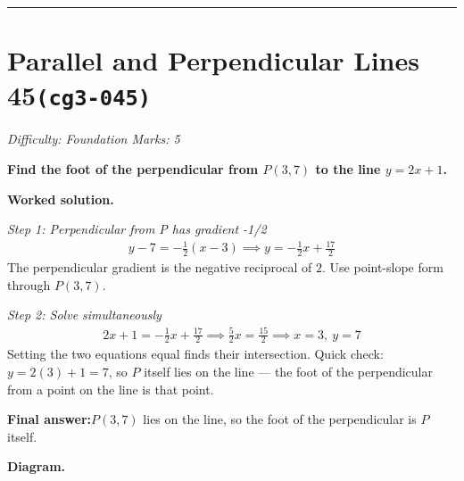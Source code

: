 \documentclass[11pt]{article}
\newcommand{\question}[1]{\par\medskip\noindent\textbf{#1}\par}
\begin{document}
\medskip\hrule

\section*{Parallel and Perpendicular Lines 45\quad\small\texttt{(cg3-045)}}
\textit{Difficulty: Foundation \quad\textbar\quad Marks: 5}

\question{Find the foot of the perpendicular from \( P(3, 7) \) to the line \( y = 2x + 1 \).}

\textbf{Worked solution.}

\textit{Step 1: Perpendicular from P has gradient -1/2}
\[\begin{gathered}
y - 7 = -\frac{1}{2}(x - 3) \implies y = -\frac{1}{2}x + \frac{17}{2}
\end{gathered}\]
The perpendicular gradient is the negative reciprocal of \( 2 \). Use point-slope form through \( P(3, 7) \).

\textit{Step 2: Solve simultaneously}
\[\begin{gathered}
2x + 1 = -\frac{1}{2}x + \frac{17}{2} \implies \frac{5}{2}x = \frac{15}{2} \implies x = 3,\ y = 7
\end{gathered}\]
Setting the two equations equal finds their intersection. Quick check: \( y = 2(3) + 1 = 7 \), so \( P \) itself lies on the line --- the foot of the perpendicular from a point on the line is that point.

\begin{answerbox}
\textbf{Final answer:}\quad \(\displaystyle P(3, 7)\) lies on the line, so the foot of the perpendicular is \(\displaystyle P\) itself.
\end{answerbox}
\textbf{Diagram.}
\end{document}
